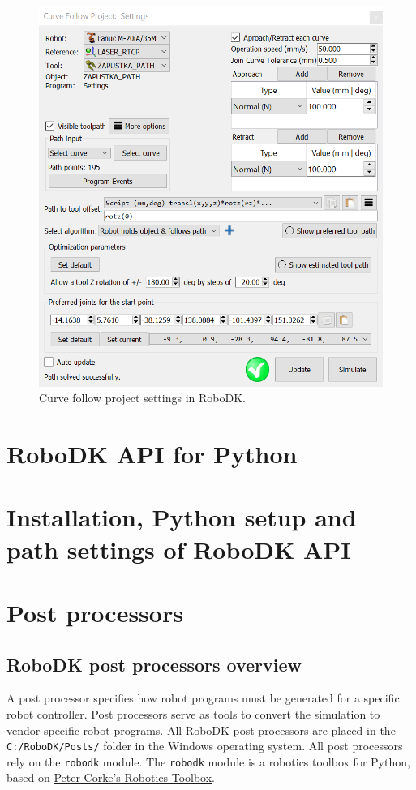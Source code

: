 \begin{figure}[h]
    \centering
    \includegraphics[width=0.9\linewidth]{img/curve_follow_settings.PNG}
    \caption{Curve follow project settings in RoboDK.}
    \label{fig:curvefollow}
\end{figure}

\section{RoboDK API for Python}

\section{Installation, Python setup and path settings of RoboDK API}

\section{Post processors}

\subsection{RoboDK post processors overview}

A post processor specifies how robot programs must be generated for a specific robot controller. Post processors serve as tools to convert the simulation to vendor-specific robot programs. All RoboDK post processors are placed in the \texttt{C:/RoboDK/Posts/} folder in the Windows operating system. All post processors rely on the \texttt{robodk} module. The \texttt{robodk} module is a robotics toolbox for Python, based on \href{http://petercorke.com/Robotics_Toolbox.html}{Peter Corke’s Robotics Toolbox}. 

